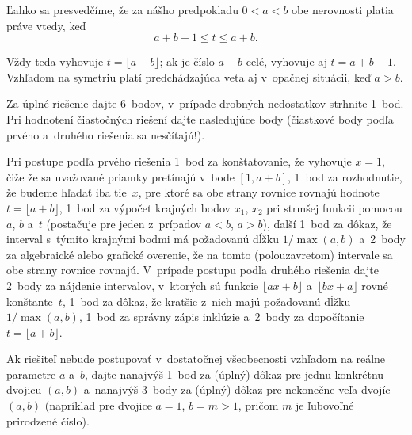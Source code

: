 {Ľahko sa presvedčíme, že za nášho predpokladu $0<a<b$
obe nerovnosti platia práve vtedy, keď
$$
a+b-1\le t\le a+b.
$$

Vždy teda vyhovuje $t=\lfloor a+b\rfloor$; ak je číslo $a+b$ celé,
vyhovuje aj $t=a+b-1$. Vzhľadom na symetriu platí predchádzajúca veta
aj v~opačnej situácii, keď $a>b$.



\nobreak\medskip\petit\noindent
Za úplné riešenie dajte 6~bodov, v~prípade drobných nedostatkov strhnite 1~bod.
Pri hodnotení čiastočných riešení dajte nasledujúce body (čiastkové body podľa
prvého a~druhého riešenia sa nesčítajú!).

Pri postupe podľa prvého riešenia 1~bod za konštatovanie, že vyhovuje $x=1$, čiže
že sa uvažované priamky pretínajú v~bode $[1,a+b]$, 1~bod za rozhodnutie,
že budeme hľadať iba tie~$x$, pre ktoré sa obe strany rovnice rovnajú hodnote
$t=\lfloor a+b\rfloor$, 1~bod za výpočet krajných bodov $x_1$, $x_2$ pri strmšej
funkcii pomocou $a$, $b$ a~$t$ (postačuje pre jeden z~prípadov $a<b$, $a>b$),
ďalší 1~bod za dôkaz, že interval s~týmito krajnými bodmi má požadovanú dĺžku $1/\max(a,b)$
a~2~body za algebraické alebo grafické overenie, že na tomto (polouzavretom) intervale
sa obe strany rovnice rovnajú.
V~prípade postupu podľa druhého riešenia dajte 2~body za nájdenie intervalov,
v~ktorých sú funkcie $\lfloor ax+b\rfloor$ a~$\lfloor bx+a\rfloor$ rovné
konštante~$t$, 1~bod za dôkaz, že kratšie z~nich majú požadovanú dĺžku $1/\max(a,b)$,
1~bod za správny zápis inklúzie a~2~body za dopočítanie $t=\lfloor a+b\rfloor$.

Ak riešiteľ nebude postupovať v~dostatočnej všeobecnosti vzhľadom na reálne
parametre $a$ a~$b$, dajte nanajvýš 1~bod za (úplný) dôkaz pre jednu
konkrétnu dvojicu $(a,b)$ a~nanajvýš 3~body za (úplný) dôkaz pre nekonečne veľa
dvojíc $(a,b)$ (napríklad pre dvojice $a=1$, $b=m>1$, pričom $m$ je ľubovoľné prirodzené číslo).
\endpetit
\bigbreak
}

